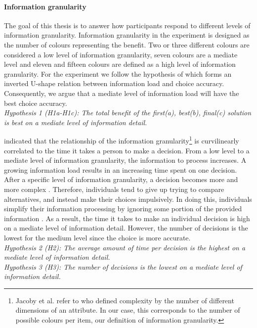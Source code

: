 \paragraph{Information granularity}
The goal of this thesis is to answer how participants respond to different levels of information granularity.
Information granularity in the experiment is designed as the number of colours representing the benefit. Two or three different colours are considered a low level of information granularity, seven colours are a mediate level and eleven and fifteen colours are defined as a high level of information granularity.
For the experiment we follow the hypothesis of \cite{Jacoby1974} which forms an inverted U-shape relation between information load and choice accuracy. Consequently, we argue that a mediate level of information load will have the best choice accuracy.\\
\textit{Hypothesis 1 (H1a-H1c): The total benefit of the first(a), best(b), final(c) solution is best on a mediate level of information detail.}

\cite{Jacoby1974} indicated that the relationship of the information granularity\footnote{Jacoby et al. refer to \cite{Hendrick1968} who defined complexity by the number of different dimensions of an attribute. In our case, this corresponds to the number of possible colours per item, our definition of information granularity. }  is curvilinearly correlated to the time it takes a person to make a decision. From a low level to a mediate level of information granularity, the information to process increases. A growing information load results in an increasing time spent on one decision. After a specific level of information granularity, a decision becomes more and more complex \citep{Hendrick1968}. Therefore, individuals tend to give up trying to compare alternatives, and instead make their choices impulsively. In doing this, individuals simplify their information processing by ignoring some portion of the provided information \citep{Malhotra1982}.
As a result, the time it takes to make an individual decision is high on a mediate level of information detail. However, the number of decisions is the lowest for the medium level since the choice is more accurate.\\ 
\textit{Hypothesis 2 (H2): The average amount of time per decision is the highest on a mediate level of information detail.}\\
\textit{Hypothesis 3 (H3): The number of decisions is the lowest on a mediate level of information detail.}\\

